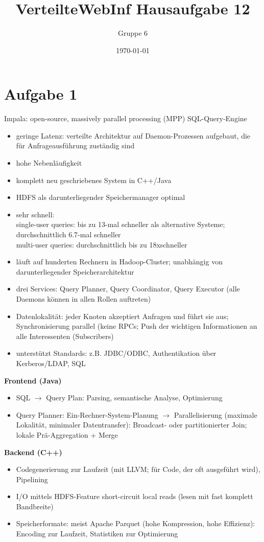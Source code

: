 \documentclass[a4paper]{scrartcl}
\author{Gruppe 6}
\title{\textbf{VerteilteWebInf Hausaufgabe 12}}
\date{\today}
\begin{document}
\maketitle

\section*{Aufgabe 1}
Impala: open-source, massively parallel processing (MPP) SQL-Query-Engine
\begin{itemize}
\item geringe Latenz: verteilte Architektur auf Daemon-Prozessen aufgebaut, die für Anfrageausführung zuständig sind
\item hohe Nebenläufigkeit
\item komplett neu geschriebenes System in C++/Java
\item HDFS als darunterliegender Speichermanager optimal
\item sehr schnell: \\
single-user queries: bis zu 13-mal schneller als alternative Systeme; durchschnittlich 6.7-mal schneller\\
multi-user queries: durchschnittlich bis zu 18xschneller

\item läuft auf hunderten Rechnern in Hadoop-Cluster; unabhängig von darunterliegender Speicherarchitektur
\item drei Services: Query Planner, Query Coordinator, Query Executor (alle Daemons können in allen Rollen auftreten)
\item Datenlokalität: jeder Knoten akzeptiert Anfragen und führt sie aus; Synchronisierung parallel (keine RPCs; Push der wichtigen Informationen an alle Interessenten (Subscribers)
\item unterstützt Standards: z.B. JDBC/ODBC, Authentikation über Kerberos/LDAP, SQL
\end{itemize}

\textbf{Frontend (Java)}
\begin{itemize}
\item SQL $ \rightarrow $ Query Plan: Parsing, semantische Analyse, Optimierung
\item Query Planner: Ein-Rechner-System-Planung $ \rightarrow $ Parallelisierung (maximale Lokalität, minimaler Datentransfer): Broadcast- oder partitionierter Join; lokale Prä-Aggregation + Merge
\end{itemize}

\textbf{Backend (C++)}
\begin{itemize}
\item Codegenerierung zur Laufzeit (mit LLVM; für Code, der oft ausgeführt wird), Pipelining
\item I/O mittels HDFS-Feature short-circuit local reads (lesen mit fast komplett Bandbreite)
\item Speicherformate: meist Apache Parquet (hohe Kompression, hohe Effizienz): Encoding zur Laufzeit, Statistiken zur Optimierung
\end{itemize}
\end{document}
